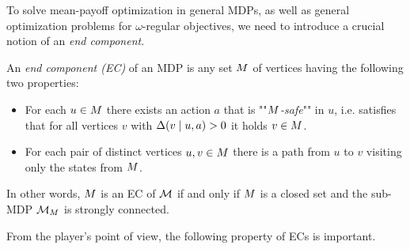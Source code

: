To solve mean-payoff optimization in general MDPs, as well as general optimization problems for $\omega$-regular objectives, we need to introduce a crucial notion of an \emph{end component}.

\begin{definition}
	\label{5-def:ec}
An \emph{end component (EC)} of an MDP is any set $M$ of vertices having the following two properties:
\begin{itemize}
 \item For each $u \in M$ there exists an action $ a $ that is ""\emph{$ M$-safe}"" in $ u $, i.e. satisfies that for all vertices  $v$ with $ \Delta(v \mid u,a) > 0 $ it holds $ v \in M $.
 \item For each pair of distinct vertices $ u,v \in M$ there is a path from $ u $ to $ v $ visiting only the states from $M$.
\end{itemize}
In other words, $ M $ is an EC of $ \mathcal{M} $ if and only if $ M $ is a closed set and the sub-MDP $ \mathcal{M}_M $ is strongly connected. 
\end{definition}


\noindent
From the player's point of view, the following property of ECs is important.


